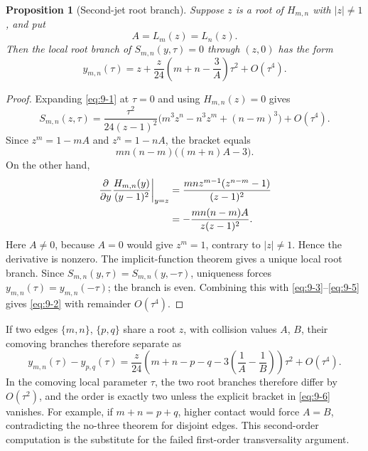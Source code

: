 \documentclass[11pt]{article}
\numberwithin{equation}{section}
\newtheorem{proposition}[theorem]{Proposition}
\theoremstyle{definition}
\begin{document}
\begin{proposition}[Second-jet root branch]\label{prop:secondjet}
Suppose $z$ is a root of $H_{m,n}$ with $|z|\neq1$, and put
\[
 A=L_m(z)=L_n(z).
\]
Then the local root branch of \(S_{m,n}(y,\tau)=0\) through \((z,0)\) has the
form
\begin{equation}
 y_{m,n}(\tau)=z+
 \frac z{24}\left(m+n-\frac3A\right)\tau^2+O(\tau^4).
 \label{eq:9-2}
\end{equation}
\end{proposition}

\begin{proof}
Expanding \eqref{eq:9-1} at \(\tau=0\) and using \(H_{m,n}(z)=0\) gives
\begin{equation}
 S_{m,n}(z,\tau)
 =\frac{\tau^2}{24(z-1)^2}
 \bigl(m^3z^n-n^3z^m+(n-m)^3\bigr)
 +O(\tau^4).
 \label{eq:9-3}
\end{equation}
Since \(z^m=1-mA\) and \(z^n=1-nA\), the bracket equals
\begin{equation}
 mn(n-m)\bigl((m+n)A-3\bigr).
 \label{eq:9-4}
\end{equation}
On the other hand,
\begin{align}
 \left.\frac{\partial}{\partial y}
 \frac{H_{m,n}(y)}{(y-1)^2}\right|_{y=z}
 &=\frac{mnz^{m-1}(z^{n-m}-1)}{(z-1)^2} \notag\\
 &=-\frac{mn(n-m)A}{z(z-1)^2}.
 \label{eq:9-5}
\end{align}
Here \(A\neq0\), because \(A=0\) would give \(z^m=1\), contrary to
\(|z|\neq1\).  Hence the derivative is nonzero.  The implicit-function
theorem gives a unique local root branch.  Since
\(S_{m,n}(y,\tau)=S_{m,n}(y,-\tau)\), uniqueness forces
\(y_{m,n}(\tau)=y_{m,n}(-\tau)\); the branch is even.  Combining this with
\eqref{eq:9-3}--\eqref{eq:9-5} gives \eqref{eq:9-2} with remainder \(O(\tau^4)\).
\end{proof}

If two edges \(\{m,n\}\), \(\{p,q\}\) share a root \(z\), with collision
values \(A\), \(B\), their comoving branches therefore separate as
\begin{equation}
 y_{m,n}(\tau)-y_{p,q}(\tau)
 =\frac z{24}
 \left(m+n-p-q-3\left(\frac1A-\frac1B\right)\right)\tau^2
 +O(\tau^4).
 \label{eq:9-6}
\end{equation}
In the comoving local parameter \(\tau\), the two root branches therefore
differ by \(O(\tau^2)\), and the order is exactly two unless the explicit
bracket in \eqref{eq:9-6} vanishes.
For example, if \(m+n=p+q\), higher contact would force \(A=B\), contradicting
the no-three theorem for disjoint edges.  This second-order computation is the
substitute for the failed first-order transversality argument.
\end{document}
